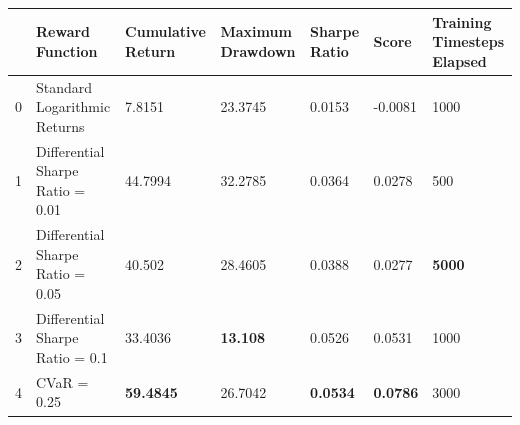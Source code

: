 \begin{tabular}{lllllll}
\toprule
 & Reward Function & Cumulative Return & Maximum Drawdown & Sharpe Ratio & Score & Training Timesteps Elapsed \\
\midrule
0 & Standard Logarithmic Returns & 7.8151 & 23.3745 & 0.0153 & -0.0081 & 1000 \\
1 & Differential Sharpe Ratio = 0.01 & 44.7994 & 32.2785 & 0.0364 & 0.0278 & 500 \\
2 & Differential Sharpe Ratio = 0.05 & 40.502 & 28.4605 & 0.0388 & 0.0277 & \textbf{5000} \\
3 & Differential Sharpe Ratio = 0.1 & 33.4036 & \textbf{13.108} & 0.0526 & 0.0531 & 1000 \\
4 & CVaR = 0.25 & \textbf{59.4845} & 26.7042 & \textbf{0.0534} & \textbf{0.0786} & 3000 \\
\bottomrule
\end{tabular}
